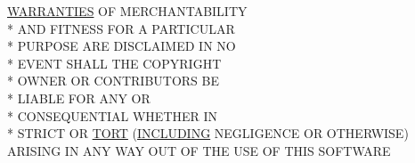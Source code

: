 \begin{DoxyCompactItemize}
\hyperlink{_l_i_c_e_n_s_e_a3f8645b457d8bdef4fd7c3549fc01039}{W\+A\+R\+R\+A\+N\+T\+I\+E\+S} O\+F M\+E\+R\+C\+H\+A\+N\+T\+A\+B\+I\+L\+I\+T\+Y \\*
A\+N\+D F\+I\+T\+N\+E\+S\+S F\+O\+R A P\+A\+R\+T\+I\+C\+U\+L\+A\+R \\*
P\+U\+R\+P\+O\+S\+E A\+R\+E D\+I\+S\+C\+L\+A\+I\+M\+E\+D I\+N N\+O \\*
E\+V\+E\+N\+T S\+H\+A\+L\+L T\+H\+E C\+O\+P\+Y\+R\+I\+G\+H\+T \\*
O\+W\+N\+E\+R O\+R C\+O\+N\+T\+R\+I\+B\+U\+T\+O\+R\+S B\+E \\*
L\+I\+A\+B\+L\+E F\+O\+R A\+N\+Y O\+R \\*
C\+O\+N\+S\+E\+Q\+U\+E\+N\+T\+I\+A\+L W\+H\+E\+T\+H\+E\+R I\+N \\*
S\+T\+R\+I\+C\+T O\+R \hyperlink{_l_i_c_e_n_s_e_a9e956ac2eb8f13166e9eebdcff33f091}{T\+O\+R\+T} (\hyperlink{_l_i_c_e_n_s_e_a4cc4ede62f5367a5ba66dc92278c86dc}{I\+N\+C\+L\+U\+D\+I\+N\+G} N\+E\+G\+L\+I\+G\+E\+N\+C\+E O\+R O\+T\+H\+E\+R\+W\+I\+S\+E) A\+R\+I\+S\+I\+N\+G I\+N A\+N\+Y W\+A\+Y O\+U\+T O\+F T\+H\+E U\+S\+E O\+F T\+H\+I\+S S\+O\+F\+T\+W\+A\+R\+E
\end{DoxyCompactItemize}
